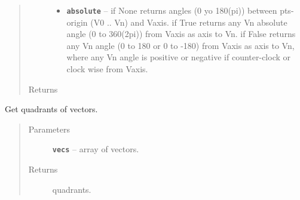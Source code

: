 \documentclass[letterpaper,10pt,english]{sphinxmanual}
\begin{document}
\begin{fulllineitems}
\begin{quote}
\begin{description}
\begin{itemize}
\item {} 
\textbf{\texttt{absolute}} -- if None returns angles (0 yo 180(pi)) between  pts-origin (V0 .. Vn) and Vaxis.
if True returns any Vn absolute angle (0 to 360(2pi)) from Vaxis as axis to Vn.
if False returns any Vn angle (0 to 180 or 0 to -180) from Vaxis as axis to Vn,
where any Vn angle is positive or negative if counter-clock or clock wise from Vaxis.

\end{itemize}

\item[{Returns}] \leavevmode


\end{description}\end{quote}

\end{fulllineitems}


\begin{fulllineitems}
\label{RRtoolbox.lib.arrayops:RRtoolbox.lib.arrayops.basic.vectorsQuadrants}
Get quadrants of vectors.
\begin{quote}\begin{description}
\item[{Parameters}] \leavevmode
\textbf{\texttt{vecs}} -- array of vectors.

\item[{Returns}] \leavevmode
quadrants.

\end{description}\end{quote}

\end{fulllineitems}

\end{document}
